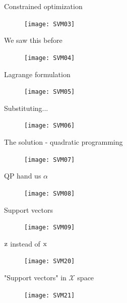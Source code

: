 \begin{frame}{Constrained optimization}
\begin{figure}
\texttt{[image: SVM03]}
\end{figure}
\end{frame}

\begin{frame}{We saw this before}
\begin{figure}
\texttt{[image: SVM04]}
\end{figure}
\end{frame}

\begin{frame}{Lagrange formulation}
\begin{figure}
\texttt{[image: SVM05]}
\end{figure}
\end{frame}

\begin{frame}{Substituting...}
\begin{figure}
\texttt{[image: SVM06]}
\end{figure}
\end{frame}


\begin{frame}{The solution - quadratic programming}
\begin{figure}
\texttt{[image: SVM07]}
\end{figure}
\end{frame}


\begin{frame}{QP hand us $\alpha$}
\begin{figure}
\texttt{[image: SVM08]}
\end{figure}
\end{frame}


\begin{frame}{Support vectors}
\begin{figure}
\texttt{[image: SVM09]}
\end{figure}
\end{frame}

\begin{frame}{${\rm z}$ instead of ${\rm x}$}
\begin{figure}
\texttt{[image: SVM20]}
\end{figure}
\end{frame}

\begin{frame}{"Support vectors" in $\mathcal{X}$ space}
\begin{figure}
\texttt{[image: SVM21]}
\end{figure}
\end{frame}

